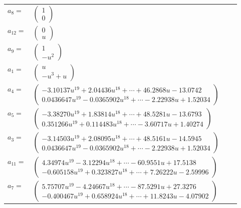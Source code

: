 \documentclass[1p]{elsarticle_modified}
\theoremstyle{definition}
\begin{document}
\begin{tabular}{m{7pt} m{180pt} m{7pt} m{180pt} }
\flushright $a_{8}=$&$\begin{pmatrix}1\\0\end{pmatrix}$ \\
\flushright $a_{12}=$&$\begin{pmatrix}0\\u\end{pmatrix}$ \\
\flushright $a_{9}=$&$\begin{pmatrix}1\\- u^2\end{pmatrix}$ \\
\flushright $a_{1}=$&$\begin{pmatrix}u\\- u^3+u\end{pmatrix}$ \\
\flushright $a_{4}=$&$\begin{pmatrix}-3.10137 u^{19}+2.04436 u^{18}+\cdots+46.2868 u-13.0742\\0.0436647 u^{19}-0.0365902 u^{18}+\cdots-2.22938 u+1.52034\end{pmatrix}$ \\
\flushright $a_{5}=$&$\begin{pmatrix}-3.38270 u^{19}+1.83814 u^{18}+\cdots+48.5281 u-13.6793\\0.351266 u^{19}+0.114483 u^{18}+\cdots-3.60717 u+1.40274\end{pmatrix}$ \\
\flushright $a_{3}=$&$\begin{pmatrix}-3.14503 u^{19}+2.08095 u^{18}+\cdots+48.5161 u-14.5945\\0.0436647 u^{19}-0.0365902 u^{18}+\cdots-2.22938 u+1.52034\end{pmatrix}$ \\
\flushright $a_{11}=$&$\begin{pmatrix}4.34974 u^{19}-3.12294 u^{18}+\cdots-60.9551 u+17.5138\\-0.605158 u^{19}+0.323827 u^{18}+\cdots+7.26222 u-2.59996\end{pmatrix}$ \\
\flushright $a_{7}=$&$\begin{pmatrix}5.75707 u^{19}-4.24667 u^{18}+\cdots-87.5291 u+27.3276\\-0.400467 u^{19}+0.658924 u^{18}+\cdots+11.8243 u-4.07902\end{pmatrix}$ \\

\end{tabular}
\end{document}
